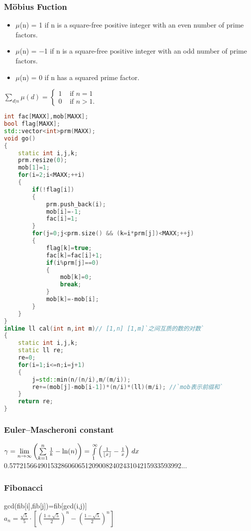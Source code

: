 \subsubsection{M\"{o}bius Fuction}
\begin{itemize}
\item $\mu$(n) = 1 if n is a square-free positive integer with an even number of prime factors.
\item $\mu$(n) = −1 if n is a square-free positive integer with an odd number of prime factors.
\item $\mu$(n) = 0 if n has a squared prime factor.
\end{itemize}
$\sum_{d | n} \mu(d) = \begin{cases}1&\mbox{ if } n=1\\
        0&\mbox{ if } n>1.\end{cases}$
\begin{lstlisting}[language=C++]
int fac[MAXX],mob[MAXX];
bool flag[MAXX];
std::vector<int>prm(MAXX);
void go()
{
    static int i,j,k;
    prm.resize(0);
    mob[1]=1;
    for(i=2;i<MAXX;++i)
    {
        if(!flag[i])
        {
            prm.push_back(i);
            mob[i]=-1;
            fac[i]=1;
        }
        for(j=0;j<prm.size() && (k=i*prm[j])<MAXX;++j)
        {
            flag[k]=true;
            fac[k]=fac[i]+1;
            if(i%prm[j]==0)
            {
                mob[k]=0;
                break;
            }
            mob[k]=-mob[i];
        }
    }
}
inline ll cal(int n,int m)// [1,n] [1,m]`之间互质的数的对数`
{
    static int i,j,k;
    static ll re;
    re=0;
    for(i=1;i<=n;i=j+1)
    {
        j=std::min(n/(n/i),m/(m/i));
        re+=(mob[j]-mob[i-1])*(n/i)*(ll)(m/i); //`mob表示前缀和`
    }
    return re;
}
\end{lstlisting}

\subsubsection{Euler–Mascheroni constant}
$\gamma = \lim\limits_{n \rightarrow \infty } \left( \sum\limits_{k=1}^n \frac{1}{k} - \ln(n) \right)=\int\limits_1^\infty\left({1\over\lfloor x\rfloor}-{1\over x}\right)\,dx$\\
0.57721566490153286060651209008240243104215933593992...\\
\subsubsection{Fibonacci}
gcd(fib[i],fib[j])=fib[gcd(i,j)]\\
$a_{n}=\frac{\sqrt{5}}{5} \cdot \left[\left(\frac{1 + \sqrt{5}}{2}\right)^{n} - \left(\frac{1 - \sqrt{5}}{2}\right)^{n}\right]$
